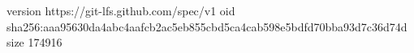 version https://git-lfs.github.com/spec/v1
oid sha256:aaa95630da4abc4aafcb2ac5eb855cbd5ca4cab598e5bdfd70bba93d7c36d74d
size 174916
